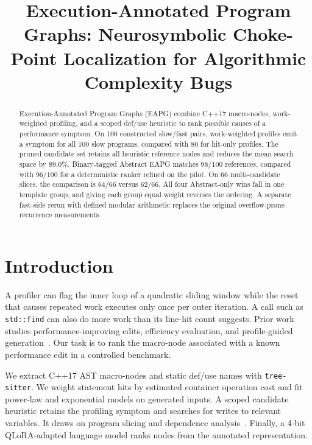 \documentclass[10pt,conference]{IEEEtran}
\title{Execution-Annotated Program Graphs: Neurosymbolic Choke-Point Localization for Algorithmic Complexity Bugs}
\author{\IEEEauthorblockN{Anonymous Authors}\IEEEauthorblockA{Phase 1 correction}}
\begin{document}
\maketitle

\begin{abstract}
Execution-Annotated Program Graphs (EAPG) combine C++17 macro-nodes, work-weighted profiling, and a scoped def/use heuristic to rank possible causes of a performance symptom. On 100 constructed slow/fast pairs, work-weighted profiles emit a symptom for all 100 slow programs, compared with 80 for hit-only profiles. The pruned candidate set retains all heuristic reference nodes and reduces the mean search space by $89.0\%$. Binary-tagged Abstract EAPG matches $98/100$ references, compared with $96/100$ for a deterministic ranker refined on the pilot. On 66 multi-candidate slices, the comparison is $64/66$ versus $62/66$. All four Abstract-only wins fall in one template group, and giving each group equal weight reverses the ordering. A separate fast-side rerun with defined modular arithmetic replaces the original overflow-prone recurrence measurements.

\end{abstract}

\section{Introduction}
\label{sec:intro}

A profiler can flag the inner loop of a quadratic sliding window while the reset that causes repeated work executes only once per outer iteration. A call such as \texttt{std::find} can also do more work than its line-hit count suggests. Prior work studies performance-improving edits, efficiency evaluation, and profile-guided generation~\cite{shypula2024pie,liu2024evalperf,huang2024effilearner}. Our task is to rank the macro-node associated with a known performance edit in a controlled benchmark.

We extract C++17 AST macro-nodes and static def/use names with \texttt{tree-sitter}. We weight statement hits by estimated container operation cost and fit power-law and exponential models on generated inputs. A scoped candidate heuristic retains the profiling symptom and searches for writes to relevant variables. It draws on program slicing and dependence analysis~\cite{weiser1981slicing,ferrante1987pdg}. Finally, a 4-bit QLoRA-adapted language model ranks nodes from the annotated representation.
\end{document}
